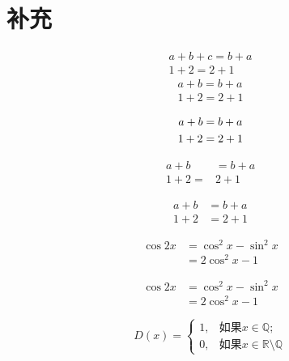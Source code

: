 \section{补充}

\par

\begin{gather}
    a + b +c = b + a \\
    1+2 = 2 + 1
\end{gather}
\begin{gather*}
    a + b = b + a \\
    1+2 = 2 + 1
\end{gather*}

\begin{gather}
a + b = b + a \notag \\
1+2 = 2 + 1 \notag
\end{gather}

\begin{align}
    a+b &= b+a \\
    1+2= & 2+1
\end{align}

\begin{align*}
a+b &= b+a \\
1+2 &=2+1
\end{align*}

\begin{equation}
    \begin{split}
    \cos 2x &= \cos^2 x - \sin^2x \\
    &=2\cos^2x-1
    \end{split} 
\end{equation}

\begin{equation*}
\begin{split}
\cos 2x &= \cos^2 x - \sin^2x \\
&=2\cos^2x-1
\end{split} 
\end{equation*}

\begin{equation}
    D(x)=\begin{cases}
    1, & \text{如果} x \in \mathbb{Q};\\
    0, & \text{如果} x \in \mathbb{R}\setminus\mathbb{Q}
    \end{cases}
\end{equation}

